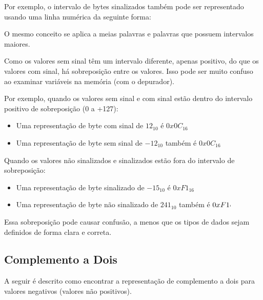 \vspace{5mm}

Por exemplo, o intervalo de bytes sinalizados também pode ser representado usando uma linha numérica da seguinte forma:

\vspace{5mm}

O mesmo conceito se aplica a meias palavras e palavras que possuem intervalos maiores.


Como os valores sem sinal têm um intervalo diferente, apenas positivo, do que os valores com sinal, há sobreposição entre os valores. Isso pode ser muito confuso ao examinar variáveis na memória (com o depurador).

Por exemplo, quando os valores sem sinal e com sinal estão dentro do intervalo positivo de sobreposição (0 a +127):

\begin{itemize}
	\item Uma representação de byte com sinal de $ 12_{10} $ é $ 0x0C_{16} $
	\item Uma representação de byte sem sinal de $-12_{10} $ também é $ 0x0C_{16} $
\end{itemize}

Quando os valores não sinalizados e sinalizados estão fora do intervalo de sobreposição:
\begin{itemize}
	\item Uma representação de byte sinalizado de $ -15_{10} $ é $ 0xF1_{16} $
	\item Uma representação de byte não sinalizado de $ 241_{10} $ também é $ 0xF1_{`} $
\end{itemize}

Essa sobreposição pode causar confusão, a menos que os tipos de dados sejam definidos de forma clara e correta.

\subsection{Complemento a Dois}
A seguir é descrito como encontrar a representação de complemento a dois para valores negativos (valores não positivos).

